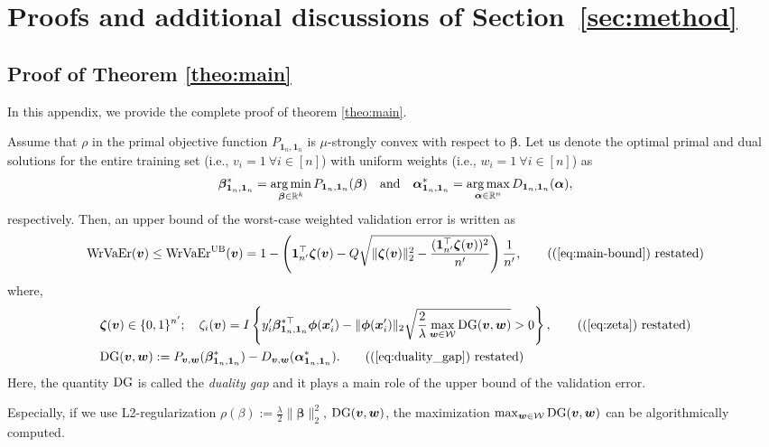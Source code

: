 \section{Proofs and additional discussions of Section~\ref{sec:method}}


\subsection{Proof of Theorem \ref{theo:main}} \label{app:main-proof}

In this appendix, we provide the complete proof of theorem \ref{theo:main}.


\begin{theorem}
	{Assume that $\rho$ in the primal objective function $P_{\bm 1_n, \bm 1_n}$ is $\mu$-strongly convex with respect to $\bm \beta$.}
	Let us denote the optimal primal and dual solutions for the entire training set (i.e., $v_i = 1 ~ \forall i \in [n]$) with uniform weights (i.e., $w_i = 1 ~ \forall i \in [n]$) as
	\begin{align*}
	 \bm \beta^*_{\bm 1_n, \bm 1_n} = \operatorname*{arg\,min}_{\bm \beta \in \mathbb{R}^k} P_{\bm 1_n, \bm 1_n}(\bm \beta)
	 \quad\text{and}\quad
	 \bm \alpha^*_{\bm 1_n, \bm 1_n} = \operatorname*{arg\,max}_{\bm \alpha \in \mathbb{R}^n} D_{\bm 1_n, \bm 1_n}(\bm \alpha),
	\end{align*}
	respectively.
	Then, an upper bound of the worst-case weighted validation error is written as 
	\begin{align}
	 {\rm WrVaEr}(\bm v)
	 \le
	 {\rm WrVaEr}^{\rm UB}(\bm v)
	 =
	 1
	 -
	 \left(
	 \bm 1_{n^\prime}^\top \bm \zeta(\bm v)
	 -
	 Q
	 \sqrt{
	 \|\bm \zeta(\bm v)\|_2^2
	 -
	 \frac{
	 (\bm 1_{n^\prime}^\top \bm \zeta(\bm v))^2
	 }{
	 n^\prime
	 }
	 }
	 \right)
	 \frac{1}{n^\prime},
	 \tag{(\ref{eq:main-bound}) restated}
	\end{align}
	where,
	\begin{align}
	 & \bm \zeta(\bm v) \in \{0, 1\}^{n^\prime};
	 \quad
	 \zeta_i(\bm v)
	 =
	 I\left\{
	 y_i^\prime \bm \beta_{\bm 1_n, \bm 1_n}^{*\top} \bm \phi(\bm x_i^\prime) - \|\bm \phi(\bm x_i^\prime)\|_2 \sqrt{\frac{2}{\lambda} \max_{\bm w \in \cW} {\rm DG}(\bm v, \bm w)} > 0
	 \right\},
	 \tag{(\ref{eq:zeta}) restated}\\
	& {\rm DG}(\bm v, \bm w) := P_{\bm v, \bm w}(\bm \beta^*_{\bm 1_n, \bm 1_n}) - D_{\bm v, \bm w}({\bm \alpha}_{\bm 1_n, \bm 1_n}^{*}).
	\tag{(\ref{eq:duality_gap}) restated}
 \end{align}
 Here, the quantity ${\rm DG}$ is called the {\em duality gap} and it plays a main role of the upper bound of the validation error.
 
 Especially, if we use L2-regularization $\rho(\beta) := \frac{\lambda}{2}\|\bm\beta\|_2^2$, ${\rm DG}(\bm v, \bm w)$, the maximization $\max_{\bm w \in {\mathcal W}} {\rm DG}(\bm v, \bm w)$ can be algorithmically computed.
 \end{theorem}

